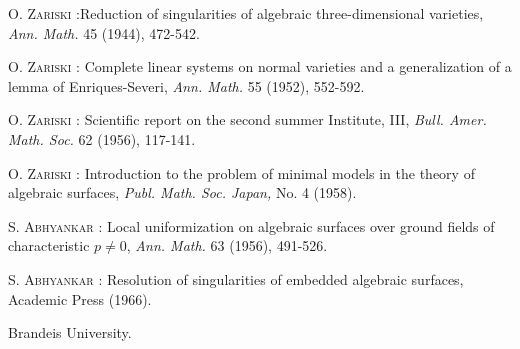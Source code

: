 \begin{thebibliography}{99}
 \textsc{O. Zariski :}\pageoriginale Reduction of singularities of algebraic three-dimensional varieties, {\em Ann. Math.} 45 (1944), 472-542.

 \textsc{O. Zariski :} Complete linear systems on normal varieties and a generalization of a lemma of Enriques-Severi, {\em Ann. Math.} 55 (1952), 552-592.

 \textsc{O. Zariski :} Scientific report on the second summer Institute, III, {\em Bull. Amer. Math. Soc.} 62 (1956), 117-141.

 \textsc{O. Zariski :} Introduction to the problem of minimal models in the theory of algebraic surfaces, {\em Publ. Math. Soc. Japan,} No. 4 (1958).

 \textsc{S. Abhyankar :} Local uniformization on algebraic surfaces over ground fields of characteristic $p\neq 0$, {\em Ann. Math.} 63 (1956), 491-526.

 \textsc{S. Abhyankar :} {\rm Resolution of singularities of embedded algebraic surfaces,} Academic Press (1966).

\end{thebibliography}

\bigskip
\noindent
Brandeis University.
